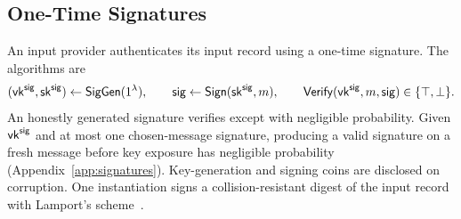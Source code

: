 \subsection{One-Time Signatures}
\label{sec:signatures}

An input provider authenticates its input record using a one-time signature.  The algorithms are
\[
  (\mathsf{vk}^{\mathsf{sig}},\mathsf{sk}^{\mathsf{sig}})\mathrel{\leftarrow}\mathsf{SigGen}(1^\lambda),\qquad
  \mathsf{sig}\mathrel{\leftarrow}\mathsf{Sign}(\mathsf{sk}^{\mathsf{sig}},m),\qquad
  \mathsf{Verify}(\mathsf{vk}^{\mathsf{sig}},m,\mathsf{sig})\in\{\top,\bot\}.
\]
An honestly generated signature verifies except with negligible probability.  Given $\mathsf{vk}^{\mathsf{sig}}$
and at most one chosen-message signature, producing a valid signature on a
fresh message before key exposure has negligible probability (Appendix~\ref{app:signatures}).
Key-generation and signing coins are disclosed on corruption.  One instantiation signs a collision-resistant digest of the input record
with Lamport's scheme~\cite{Lamport1979Signatures}.
